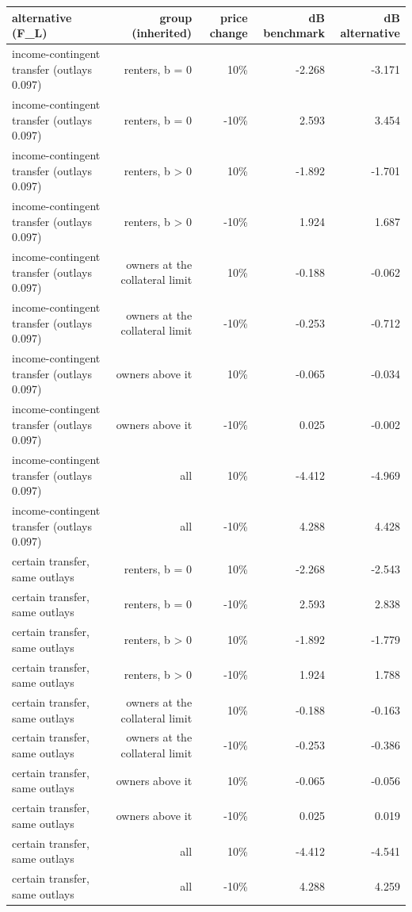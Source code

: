 \begin{tabular}{lrrrr}
\toprule
alternative (F\_L) & group (inherited) & price change & dB benchmark & dB alternative \\
\midrule
income-contingent transfer (outlays 0.097) & renters, b = 0 & 10\% & -2.268 & -3.171 \\
income-contingent transfer (outlays 0.097) & renters, b = 0 & -10\% & 2.593 & 3.454 \\
income-contingent transfer (outlays 0.097) & renters, b > 0 & 10\% & -1.892 & -1.701 \\
income-contingent transfer (outlays 0.097) & renters, b > 0 & -10\% & 1.924 & 1.687 \\
income-contingent transfer (outlays 0.097) & owners at the collateral limit & 10\% & -0.188 & -0.062 \\
income-contingent transfer (outlays 0.097) & owners at the collateral limit & -10\% & -0.253 & -0.712 \\
income-contingent transfer (outlays 0.097) & owners above it & 10\% & -0.065 & -0.034 \\
income-contingent transfer (outlays 0.097) & owners above it & -10\% & 0.025 & -0.002 \\
income-contingent transfer (outlays 0.097) & all & 10\% & -4.412 & -4.969 \\
income-contingent transfer (outlays 0.097) & all & -10\% & 4.288 & 4.428 \\
certain transfer, same outlays & renters, b = 0 & 10\% & -2.268 & -2.543 \\
certain transfer, same outlays & renters, b = 0 & -10\% & 2.593 & 2.838 \\
certain transfer, same outlays & renters, b > 0 & 10\% & -1.892 & -1.779 \\
certain transfer, same outlays & renters, b > 0 & -10\% & 1.924 & 1.788 \\
certain transfer, same outlays & owners at the collateral limit & 10\% & -0.188 & -0.163 \\
certain transfer, same outlays & owners at the collateral limit & -10\% & -0.253 & -0.386 \\
certain transfer, same outlays & owners above it & 10\% & -0.065 & -0.056 \\
certain transfer, same outlays & owners above it & -10\% & 0.025 & 0.019 \\
certain transfer, same outlays & all & 10\% & -4.412 & -4.541 \\
certain transfer, same outlays & all & -10\% & 4.288 & 4.259 \\
\bottomrule
\end{tabular}
